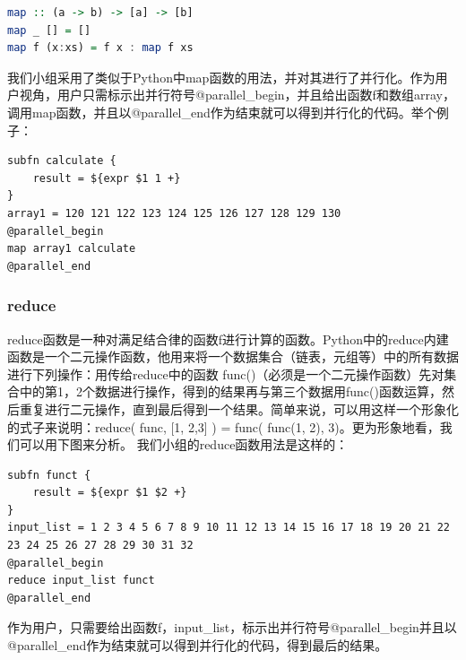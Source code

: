 \documentclass[paper=a4]{ctexart} %
\numberwithin{equation}{section} %
\numberwithin{figure}{section} %
\numberwithin{table}{section} %
\begin{document}
\begin{lstlisting}[language=haskell]
map :: (a -> b) -> [a] -> [b]
map _ [] = []
map f (x:xs) = f x : map f xs
\end{lstlisting}

我们小组采用了类似于Python中map函数的用法，并对其进行了并行化。作为用户视角，用户只需标示出并行符号@parallel\_begin，并且给出函数f和数组array，调用map函数，并且以@parallel\_end作为结束就可以得到并行化的代码。举个例子：

\begin{lstlisting}[language=shell]
subfn calculate {
    result = ${expr $1 1 +}
}
array1 = 120 121 122 123 124 125 126 127 128 129 130
@parallel_begin
map array1 calculate
@parallel_end
\end{lstlisting}

\subsubsection{reduce}

reduce函数是一种对满足结合律的函数f进行计算的函数。Python中的reduce内建函数是一个二元操作函数，他用来将一个数据集合（链表，元组等）中的所有数据进行下列操作：用传给reduce中的函数 func()（必须是一个二元操作函数）先对集合中的第1，2个数据进行操作，得到的结果再与第三个数据用func()函数运算，然后重复进行二元操作，直到最后得到一个结果。简单来说，可以用这样一个形象化的式子来说明：reduce( func, [1, 2,3] ) = func( func(1, 2), 3)。更为形象地看，我们可以用下图来分析。
我们小组的reduce函数用法是这样的：

\begin{lstlisting}[language=shell]
subfn funct {
    result = ${expr $1 $2 +}
}
input_list = 1 2 3 4 5 6 7 8 9 10 11 12 13 14 15 16 17 18 19 20 21 22 23 24 25 26 27 28 29 30 31 32
@parallel_begin
reduce input_list funct
@parallel_end
\end{lstlisting}

作为用户，只需要给出函数f，input\_list，标示出并行符号@parallel\_begin并且以@parallel\_end作为结束就可以得到并行化的代码，得到最后的结果。
\end{document}
